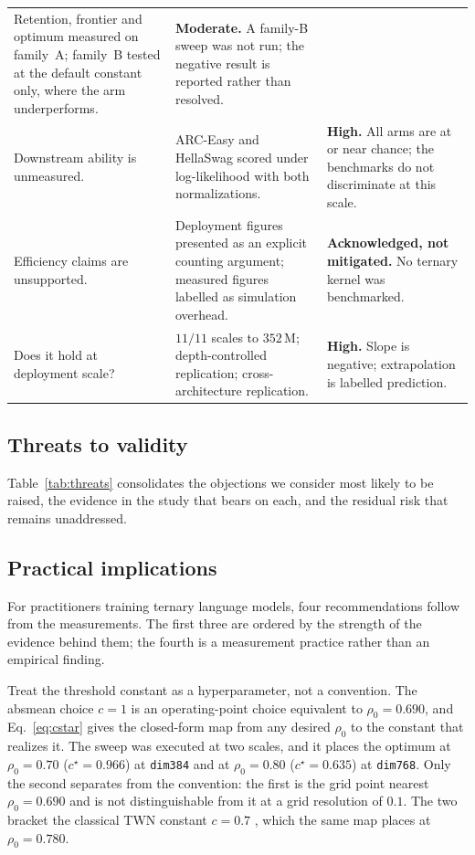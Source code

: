 \documentclass[final,5p,times,twocolumn]{elsarticle}
\theoremstyle{remark}
\newcommand{\rhoz}{\rho_{0}}
\begin{document}
\begin{table}[!tb]
\begin{tabular}{@{}p{3.0cm}p{4.9cm}p{4.3cm}@{}}
Retention, frontier and optimum measured on family~A; family~B tested at the
default constant only, where the arm underperforms. &
\textbf{Moderate.} A family-B sweep was not run; the negative result is
reported rather than resolved. \\
\addlinespace
Downstream ability is unmeasured. &
ARC-Easy and HellaSwag scored under log-likelihood with both normalizations. &
\textbf{High.} All arms are at or near chance; the benchmarks do not
discriminate at this scale. \\
\addlinespace
Efficiency claims are unsupported. &
Deployment figures presented as an explicit counting argument; measured
figures labelled as simulation overhead. &
\textbf{Acknowledged, not mitigated.} No ternary kernel was benchmarked. \\
\addlinespace
Does it hold at deployment scale? &
$11/11$ scales to $352$\,M; depth-controlled replication; cross-architecture
replication. &
\textbf{High.} Slope is negative; extrapolation is labelled prediction. \\
\bottomrule
\end{tabular}
\end{table}

\subsection{Threats to validity}
\label{sec:disc-threats}

Table~\ref{tab:threats} consolidates the objections we consider most likely to
be raised, the evidence in the study that bears on each, and the residual risk
that remains unaddressed.



\subsection{Practical implications}
\label{sec:disc-practical}

For practitioners training ternary language models, four recommendations
follow from the measurements. The first three are ordered by the strength of
the evidence behind them; the fourth is a measurement practice rather than an
empirical finding.

Treat the threshold constant as a hyperparameter, not a convention. The
absmean choice $c = 1$ is an operating-point choice equivalent to
$\rhoz = 0.690$, and Eq.~\eqref{eq:cstar} gives the closed-form map from any
desired $\rhoz$ to the constant that realizes it. The sweep was executed at
two scales, and it places the optimum at $\rhoz = 0.70$ ($c^\star = 0.966$)
at \texttt{dim384} and at $\rhoz = 0.80$ ($c^\star = 0.635$) at
\texttt{dim768}. Only the second separates from the convention: the first is
the grid point nearest $\rhoz = 0.690$ and is not distinguishable from it at
a grid resolution of $0.1$. The two bracket the classical TWN constant
$c = 0.7$ \cite{li2016}, which the same map places at $\rhoz = 0.780$.
\end{document}

